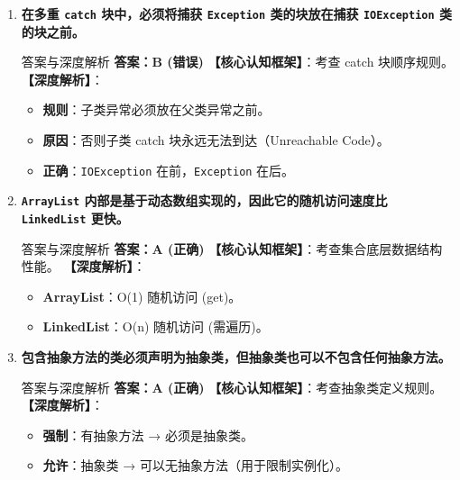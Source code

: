 ﻿\documentclass[12pt, a4paper]{ctexart}
\newcommand{\code}[1]{\texttt{#1}}
\begin{document}
\begin{enumerate}[label=\textbf{\arabic*.}, leftmargin=*, itemsep=1.5em]
	\item \textbf{在多重 \code{catch} 块中，必须将捕获 \code{Exception} 类的块放在捕获 \code{IOException} 类的块之前。}
	      \begin{bluebox}{答案与深度解析}
		      \textbf{答案：B (错误)}
		      \textbf{【核心认知框架】}：考查 catch 块顺序规则。
		      \textbf{【深度解析】}：
		      \begin{itemize}[leftmargin=*, nosep]
			      \item \textbf{规则}：子类异常必须放在父类异常之前。
			      \item \textbf{原因}：否则子类 catch 块永远无法到达（Unreachable Code）。
			      \item \textbf{正确}：\code{IOException} 在前，\code{Exception} 在后。
		      \end{itemize}
	      \end{bluebox}

	\item \textbf{\code{ArrayList} 内部是基于动态数组实现的，因此它的随机访问速度比 \code{LinkedList} 更快。}
	      \begin{bluebox}{答案与深度解析}
		      \textbf{答案：A (正确)}
		      \textbf{【核心认知框架】}：考查集合底层数据结构性能。
		      \textbf{【深度解析】}：
		      \begin{itemize}[leftmargin=*, nosep]
			      \item \textbf{ArrayList}：O(1) 随机访问 (get)。
			      \item \textbf{LinkedList}：O(n) 随机访问 (需遍历)。
		      \end{itemize}
	      \end{bluebox}

	\item \textbf{包含抽象方法的类必须声明为抽象类，但抽象类也可以不包含任何抽象方法。}
	      \begin{bluebox}{答案与深度解析}
		      \textbf{答案：A (正确)}
		      \textbf{【核心认知框架】}：考查抽象类定义规则。
		      \textbf{【深度解析】}：
		      \begin{itemize}[leftmargin=*, nosep]
			      \item \textbf{强制}：有抽象方法 → 必须是抽象类。
			      \item \textbf{允许}：抽象类 → 可以无抽象方法（用于限制实例化）。
		      \end{itemize}
	      \end{bluebox}


\end{enumerate}
\end{document}
